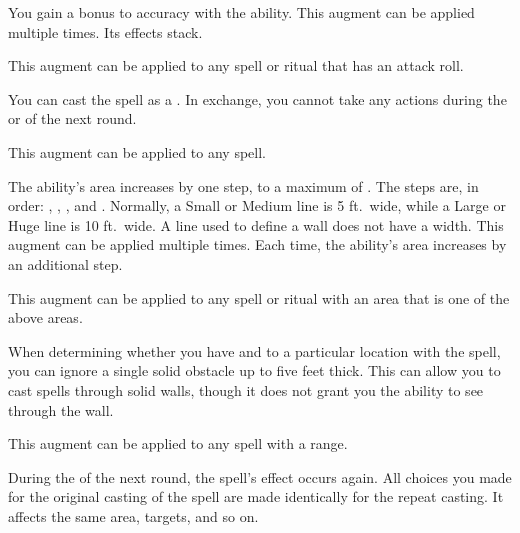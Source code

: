              You gain a  bonus to accuracy with the ability.
            This augment can be applied multiple times.
            Its effects stack.
            \par This augment can be applied to any spell or ritual that has an attack roll.

             You can cast the spell as a .
            In exchange, you cannot take any actions during the  or  of the next round.
            \par This augment can be applied to any spell.

             The ability's area increases by one step, to a maximum of \areahuge.
            The steps are, in order: \areasmall, \areamed, \arealarge, and \areahuge.
            Normally, a Small or Medium line is 5 ft.\ wide, while a Large or Huge line is 10 ft.\ wide.
            A line used to define a wall does not have a width.
            This augment can be applied multiple times.
            Each time, the ability's area increases by an additional step.
            \par This augment can be applied to any spell or ritual with an area that is one of the above areas.

             When determining whether you have  and  to a particular location with the spell, you can ignore a single solid obstacle up to five feet thick.
            This can allow you to cast spells through solid walls, though it does not grant you the ability to see through the wall.
            \par This augment can be applied to any spell with a range.


             During the  of the next round, the spell's effect occurs again.
            All choices you made for the original casting of the spell are made identically for the repeat casting.
            It affects the same area, targets, and so on.

